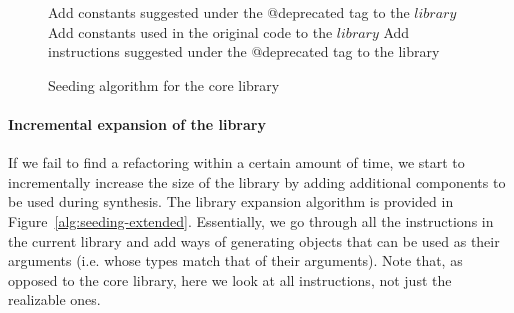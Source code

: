 \documentclass[runningheads,a4paper]{llncs}
\begin{document}
\begin{figure}
\begin{algorithm}[H]
\SetAlgoLined
{}
 Add constants suggested under the @deprecated tag to the $library$\;
 Add constants used in the original code to the $library$\;
 Add instructions suggested under the @deprecated tag to the library\;
\end{algorithm}
 \caption{Seeding algorithm for the core library}
\label{alg:seeding-core}
\end{figure}

\paragraph{Incremental expansion of the library}
If we fail to find a refactoring within a certain amount of time,
we start to incrementally increase the size of the library by adding additional components to be used during synthesis.
The library expansion algorithm is provided in Figure~\ref{alg:seeding-extended}.
Essentially, we go through all the instructions in the current library and add
ways of generating objects that can be used as their arguments (i.e. whose types match that of their arguments).
Note that, as opposed to the core library, here we look at all instructions, not just the realizable ones.


\end{document}
